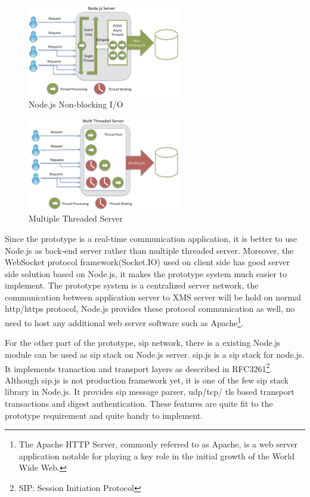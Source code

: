 \begin{figure}
	\centering
    	\includegraphics[width=0.60\textwidth,natwidth=610,natheight=642]{figs/nodejs.png}
  	\caption{Node.js Non-blocking I/O\cite{strongloop:nodejs}}
  	\label{fig:nodejs}
\end{figure}

\begin{figure}
	\centering
    	\includegraphics[width=0.60\textwidth,natwidth=610,natheight=642]{figs/threading_java.png}
  	\caption{Multiple Threaded Server\cite{strongloop:nodejs}}
  	\label{fig:threading_java}
\end{figure}

\par Since the prototype is a real-time communication application, it is better to use Node.js as back-end server rather than multiple threaded server. Moreover, the WebSocket protocol framework(Socket.IO) used on client side has good server side solution based on Node.js, it makes the prototype system much easier to implement. The prototype system is a centralized server network, the communication between application server to XMS server will be hold on normal \gls{http}/\gls{https} protocol, Node.js provides these protocol communication as well, no need to host any additional web server software such as Apache\footnote{The Apache HTTP Server, commonly referred to as Apache, is a web server application notable for playing a key role in the initial growth of the World Wide Web.\cite{wiki:apache}}.

\par For the other part of the prototype, \gls{sip} network, there is a existing Node.js module can be used as \gls{sip} stack on Node.js server. sip.js is a \gls{sip} stack for node.js. It implements tranaction and transport layers as described in RFC3261\footnote{SIP: Session Initiation Protocol}.\cite{github:sipjs} Although sip.js is not production framework yet, it is one of the few \gls{sip} stack library in Node.js. It provides \gls{sip} message parser, \gls{udp}/\gls{tcp}/ \gls{tls} based transport transactions and digest authentication. These features are quite fit to the prototype requirement and quite handy to implement.

